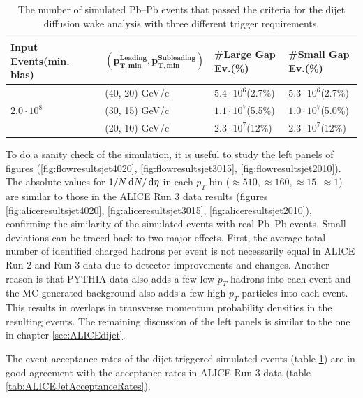 \documentclass[
  a4paper,
  12pt,
  oneside,
  parskip=half,
  listof=totoc,
  bibliography=totoc,
  DIV=12,
  numbers=noenddot,
  BA.tex
  ]{subfiles}
\begin{document}
\begin{table}[H]
	\begin{footnotesize}
		\begin{tabular}{llll}
			\hline
			\textbf{Input Events(min. bias)} & $\mathbf{(p_{T,\textbf{min}}^\textbf{Leading}, p_{T,\textbf{min}}^\textbf{Subleading})}$ & \textbf{\#Large Gap Ev.(\%)} & \textbf{\#Small Gap Ev.(\%)} \\
			\hline
			\multirow{3}{*}{$2.0 \cdot 10^8$}   & (40, 20) GeV/c    & $5.4\cdot 10^6$(2.7\%)                       & $5.3\cdot 10^6$(2.7\%)                       \\
			& (30, 15) GeV/c    &          $1.1\cdot 10^7$(5.5\%)                   &          $1.0 \cdot 10^7$(5.0\%)                   \\
			& (20, 10) GeV/c    &           $2.3\cdot 10^7$(12\%)                  &             $2.3\cdot 10^7$(12\%)               \\
			\hline
		\end{tabular}
	\end{footnotesize}
	\caption{The number of simulated Pb--Pb events that passed the criteria for the dijet diffusion wake analysis with three different trigger requirements.}
	\label{tab:SimJetAcceptance}
\end{table}

To do a sanity check of the simulation, it is useful to study the left panels of figures (\ref{fig:flowresultsjet4020}, \ref{fig:flowresultsjet3015}, \ref{fig:flowresultsjet2010}). The absolute values for $1/N \mathop{}\!\mathrm{d} N/\mathop{}\!\mathrm{d} \eta$ in each $p_T$ bin ($\approx 510, \approx 160, \approx 15, \approx 1$) are similar to those in the ALICE Run 3 data results (figures \ref{fig:aliceresultsjet4020}, \ref{fig:aliceresultsjet3015}, \ref{fig:aliceresultsjet2010}), confirming the similarity of the simulated events with real Pb--Pb events. Small deviations can be traced back to two major effects. First, the average total number of identified charged hadrons per event is not necessarily equal in ALICE Run 2 and Run 3 data due to detector improvements and changes. Another reason is that PYTHIA data also adds a few low-$p_T$ hadrons into each event and the MC generated background also adds a few high-$p_T$ particles into each event. This results in overlaps in transverse momentum probability densities in the resulting events. The remaining discussion of the left panels is similar to the one in chapter \ref{sec:ALICEdijet}. 

The event acceptance rates of the dijet triggered simulated events (table \ref{tab:SimJetAcceptance}) are in good agreement with the acceptance rates in ALICE Run 3 data (table \ref{tab:ALICEJetAcceptanceRates}).
\end{document}
